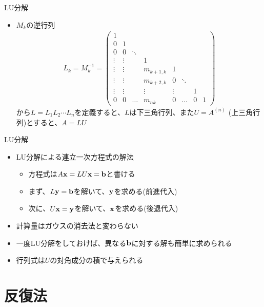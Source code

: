 \documentclass[dvipdfmx]{beamer}
\begin{document}
\begin{frame}[t,fragile]{LU分解}
  \begin{itemize}
    \setlength{\itemsep}{1em}
  \item $M_k$の逆行列
    \begin{align*}
      L_k = M_k^{-1} = 
      \begin{pmatrix}
        1 & \\
        0 & 1 \\
        0 & 0 & \ddots \\
        \vdots & \vdots & & 1 \\
        \vdots & \vdots & & m_{k+1,k} & 1 & \\
        \vdots & \vdots & & m_{k+2,k} & 0 & \ddots \\
        \vdots & \vdots & & \vdots & \vdots & & 1 & \\
        0 & 0 & \hdots & m_{nk} & 0 & \hdots & 0 & 1
      \end{pmatrix}
    \end{align*}
    から$L=L_1L_2\cdots L_n$を定義すると、$L$は下三角行列、また$U = A^{(n)}$ (上三角行列)とすると、$A = LU$
  \end{itemize}
\end{frame}

\begin{frame}[t,fragile]{LU分解}
  \begin{itemize}
    \setlength{\itemsep}{1em}
  \item LU分解による連立一次方程式の解法
    \begin{itemize}
    \item 方程式は$A{\bf x} = LU{\bf x} = {\bf b}$と書ける
    \item まず、$L{\bf y} = {\bf b}$を解いて、${\bf y}$を求める(前進代入)
    \item 次に、$U{\bf x} = {\bf y}$を解いて、${\bf x}$を求める(後退代入)
    \end{itemize}
  \item 計算量はガウスの消去法と変わらない
  \item 一度LU分解をしておけば、異なる${\bf b}$に対する解も簡単に求められる
  \item 行列式は$U$の対角成分の積で与えられる
  \end{itemize}
\end{frame}

\section{反復法}
\end{document}
